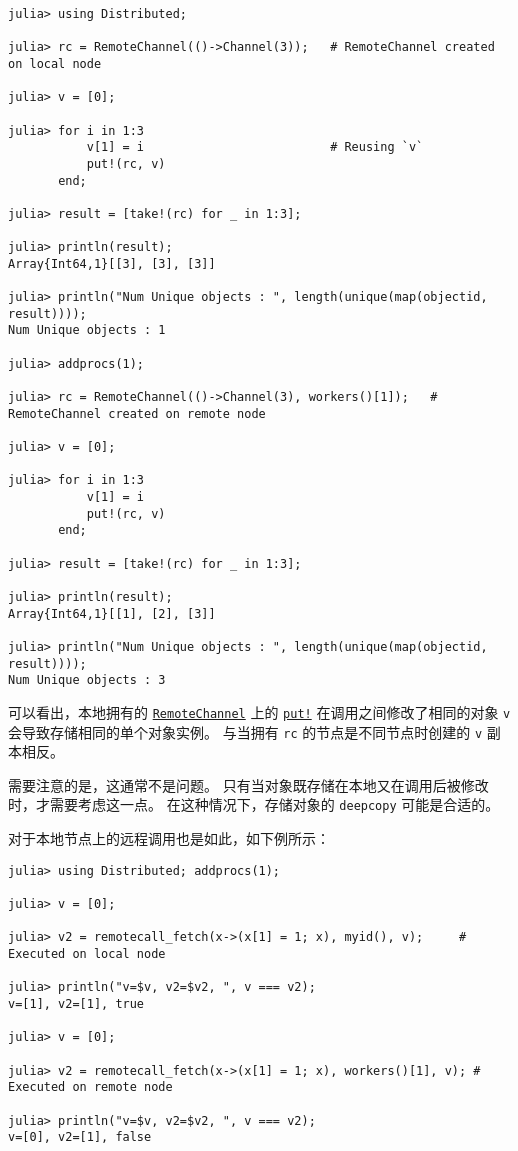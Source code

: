 \begin{verbatim}
julia> using Distributed;

julia> rc = RemoteChannel(()->Channel(3));   # RemoteChannel created on local node

julia> v = [0];

julia> for i in 1:3
           v[1] = i                          # Reusing `v`
           put!(rc, v)
       end;

julia> result = [take!(rc) for _ in 1:3];

julia> println(result);
Array{Int64,1}[[3], [3], [3]]

julia> println("Num Unique objects : ", length(unique(map(objectid, result))));
Num Unique objects : 1

julia> addprocs(1);

julia> rc = RemoteChannel(()->Channel(3), workers()[1]);   # RemoteChannel created on remote node

julia> v = [0];

julia> for i in 1:3
           v[1] = i
           put!(rc, v)
       end;

julia> result = [take!(rc) for _ in 1:3];

julia> println(result);
Array{Int64,1}[[1], [2], [3]]

julia> println("Num Unique objects : ", length(unique(map(objectid, result))));
Num Unique objects : 3
\end{verbatim}



可以看出，本地拥有的 \hyperlink{16773267780467157552}{\texttt{RemoteChannel}} 上的 \hyperlink{10812715779190652189}{\texttt{put!}} 在调用之间修改了相同的对象 \texttt{v} 会导致存储相同的单个对象实例。 与当拥有 \texttt{rc} 的节点是不同节点时创建的 \texttt{v} 副本相反。



需要注意的是，这通常不是问题。 只有当对象既存储在本地又在调用后被修改时，才需要考虑这一点。 在这种情况下，存储对象的 \texttt{deepcopy} 可能是合适的。



对于本地节点上的远程调用也是如此，如下例所示：




\begin{verbatim}
julia> using Distributed; addprocs(1);

julia> v = [0];

julia> v2 = remotecall_fetch(x->(x[1] = 1; x), myid(), v);     # Executed on local node

julia> println("v=$v, v2=$v2, ", v === v2);
v=[1], v2=[1], true

julia> v = [0];

julia> v2 = remotecall_fetch(x->(x[1] = 1; x), workers()[1], v); # Executed on remote node

julia> println("v=$v, v2=$v2, ", v === v2);
v=[0], v2=[1], false
\end{verbatim}



